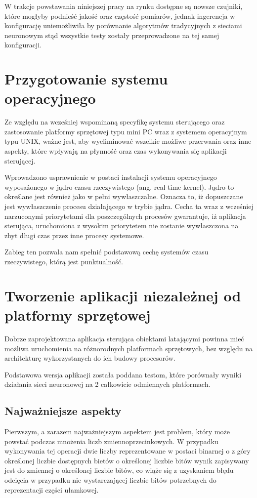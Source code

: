 W trakcje powstawania niniejszej pracy na rynku dostępne są nowsze czujniki, które mogłyby podnieść jakość oraz częstość pomiarów, jednak ingerencja w konfigurację uniemożliwiła by porównanie algorytmów tradycyjnych z sieciami neuronowym stąd wszystkie testy zostały przeprowadzone na tej samej konfiguracji.




\section{Przygotowanie systemu operacyjnego}
Ze względu na wcześniej wspominaną specyfikę systemu sterującego oraz zastosowanie platformy sprzętowej typu mini PC wraz z systemem operacyjnym typu UNIX, ważne jest, aby wyeliminować wszelkie możliwe przerwania oraz inne aspekty, które wpływają na płynność oraz czas wykonywania się aplikacji sterującej.

Wprowadzono usprawnienie w postaci instalacji systemu operacyjnego wyposażonego w jądro czasu rzeczywistego (ang. real-time kernel). Jądro to określane jest również jako w pełni wywłaszczalne. Oznacza to, iż dopuszczane jest wywłaszczenie procesu działającego w trybie jądra. Cecha ta wraz z wcześniej narzuconymi priorytetami dla poszczególnych procesów gwarantuje, iż aplikacja sterująca, uruchomiona z wysokim priorytetem nie zostanie wywłaszczona na zbyt długi czas przez inne procesy systemowe.

Zabieg ten pozwala nam spełnić podstawową cechę systemów czasu rzeczywistego, którą jest punktualność.




\section{Tworzenie aplikacji niezależnej od platformy sprzętowej}
Dobrze zaprojektowana aplikacja sterująca obiektami latającymi powinna mieć możliwa uruchomienia na różnorodnych platformach sprzętowych, bez względu na architekturę wykorzystanych do ich budowy procesorów.

Podstawowa wersja aplikacji została poddana testom, które porównały wyniki działania sieci neuronowej na 2 całkowicie odmiennych platformach. 


\subsection{Najważniejsze aspekty}
Pierwszym, a zarazem najważniejszym aspektem jest problem, który może powstać podczas mnożenia liczb zmiennoprzecinkowych. W przypadku wykonywania tej operacji dwie liczby reprezentowane w postaci binarnej o z góry określonej liczbie dostępnych bietów o określonej liczbie bitów  wynik zapisywany jest do zmiennej o określonej liczbie bitów, co wiąże się z uzyskaniem błędu odcięcia w przypadku nie wystarczającej liczbie bitów potrzebnych do reprezentacji części ułamkowej. 



